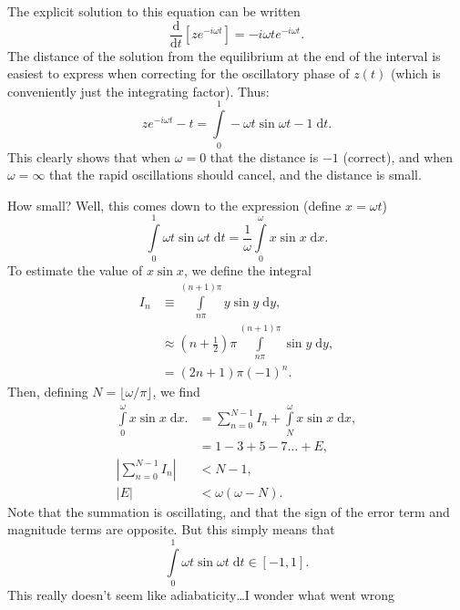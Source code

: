 \documentclass[12pt]{article}
\newcommand*{\rd}[2]{\frac{\mathrm{d}#1}{\mathrm{d}#2}}
\newcommand*{\abs}[1]{\left|#1\right|}
\newcommand*{\p}[1]{\left(#1\right)}
\newcommand*{\s}[1]{\left[#1\right]}
\begin{document}
The explicit solution to this equation can be written
\begin{equation}
    \rd{}{t}\s{z e^{-i\omega t}} = -i\omega t e^{-i\omega t}.
\end{equation}
The distance of the solution from the equilibrium at the end of the interval is
easiest to express when correcting for the oscillatory phase of $z(t)$ (which is
conveniently just the integrating factor). Thus:
\begin{equation}
    ze^{-i\omega t} - t
        = \int\limits_0^1
            -\omega t \sin \omega t
            - 1\;\mathrm{d}t.
\end{equation}
This clearly shows that when $\omega = 0$ that the distance is $-1$ (correct),
and when $\omega = \infty$ that the rapid oscillations should cancel, and the
distance is small.

How small? Well, this comes down to the expression (define $x = \omega t$)
\begin{equation}
    \int\limits_0^1 \omega t \sin \omega t\;\mathrm{d}t
        = \frac{1}{\omega}\int\limits_0^\omega
            x\sin x\;\mathrm{d}x.
\end{equation}
To estimate the value of $x \sin x$, we define the integral
\begin{align}
    I_n
        &\equiv \int\limits_{n\pi}^{(n+1)\pi}
            y \sin y\;\mathrm{d}y,\\
        &\approx
            \p{n + \frac{1}{2}}\pi
                \int\limits_{n\pi}^{(n+1)\pi} \sin y\;\mathrm{d}y,\\
        &=
            \p{2n + 1}\pi\p{-1}^{n}.
\end{align}
Then, defining $N = \lfloor \omega / \pi \rfloor$, we find
\begin{align}
    \int\limits_0^\omega x\sin x\;\mathrm{d}x.
        &= \sum\limits_{n=0}^{N - 1}
            I_n
            + \int\limits_{N}^\omega
                x\sin x\;\mathrm{d}x,\\
        &=
            1 - 3 + 5 - 7 \dots
            + E,\\
    \abs{\sum\limits_{n=0}^{N - 1} I_n} &< N - 1,\\
    \abs{E} &< \omega\p{\omega - N}.
\end{align}
Note that the summation is oscillating, and that the sign of the error term and
magnitude terms are opposite. But this simply means that
\begin{equation}
    \int\limits_0^1 \omega t \sin \omega t\;\mathrm{d}t
        \in [-1, 1].
\end{equation}
This really doesn't seem like adiabaticity\dots I wonder what went wrong
\end{document}
